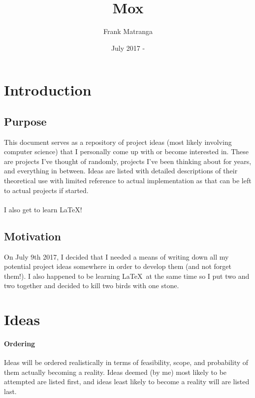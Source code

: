 \documentclass{article}[2017/07/09]
\title{Mox}
\author{Frank Matranga}
\date{July 2017 - }
\begin{document}
  \maketitle
  \newpage

  \tableofcontents
  \newpage

  \section{Introduction}
  \subsection{Purpose}
    This document serves as a repository of project ideas (most likely involving computer science) that I personally come up with or become interested in.
    These are projects I've thought of randomly, projects I've been thinking about for years, and everything in between.
    Ideas are listed with detailed descriptions of their theoretical use with limited reference to actual implementation as that can be left to actual projects if started.\\\\
    I also get to learn \LaTeX!
  \subsection{Motivation}
    On July 9th 2017, I decided that I needed a means of writing down all my potential project ideas somewhere in order to develop them (and not forget them!).
    I also happened to be learning \LaTeX\  at the same time so I put two and two together and decided to kill two birds with one stone.

  \section{Ideas}
  \paragraph{Ordering}
    Ideas will be ordered realistically in terms of feasibility, scope, and probability of them actually becoming a reality. Ideas deemed (by me) most likely to be attempted are listed first, and ideas least likely to become a reality will are listed last.
\end{document}
